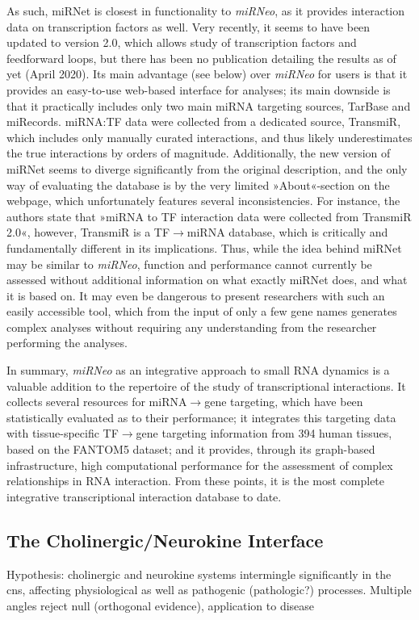 As such, miRNet\cite{Fan2016} is closest in functionality to \emph{miRNeo}, as it provides interaction data on transcription factors as well. Very recently, it seems to have been updated to version 2.0, which allows study of transcription factors and feedforward loops, but there has been no publication detailing the results as of yet (April 2020). Its main advantage (see below) over \emph{miRNeo} for users is that it provides an easy-to-use web-based interface for analyses; its main downside is that it practically includes only two main miRNA targeting sources, TarBase and miRecords. miRNA:TF data were collected from a dedicated source, TransmiR, which includes only manually curated interactions, and thus likely underestimates the true interactions by orders of magnitude. Additionally, the new version of miRNet seems to diverge significantly from the original description,\cite{Fan2016} and the only way of evaluating the database is by the very limited »About«-section on the webpage, which unfortunately features several inconsistencies. For instance, the authors state that »miRNA to TF interaction data were collected from TransmiR 2.0«, however, TransmiR is a TF$\to$miRNA database, which is critically and fundamentally different in its implications. Thus, while the idea behind miRNet may be similar to \emph{miRNeo}, function and performance cannot currently be assessed without additional information on what exactly miRNet does, and what it is based on. It may even be dangerous to present researchers with such an easily accessible tool, which from the input of only a few gene names generates complex analyses without requiring any understanding from the researcher performing the analyses.

In summary, \emph{miRNeo} as an integrative approach to small RNA dynamics is a valuable addition to the repertoire of the study of transcriptional interactions. It collects several resources for miRNA$\to$gene targeting, which have been statistically evaluated as to their performance; it integrates this targeting data with tissue-specific TF$\to$gene targeting information from 394 human tissues, based on the FANTOM5 dataset; and it provides, through its graph-based infrastructure, high computational performance for the assessment of complex relationships in RNA interaction. From these points, it is the most complete integrative transcriptional interaction database to date.

\subsection{The Cholinergic/Neurokine Interface}
Hypothesis: cholinergic and neurokine systems intermingle significantly in the cns, affecting physiological as well as pathogenic (pathologic?) processes. Multiple angles reject null (orthogonal evidence), application to disease

